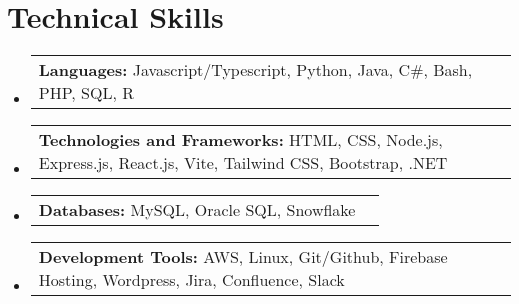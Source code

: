 \documentclass[letterpaper,11pt]{article}
\makeatletter
\newcommand{\resumeSubItem}[2]{ %
  \item
    \begin{tabular*}{\textwidth}{@{}l@{}l}
      {\small\textbf{#1}} {\small #2} \\ %
    \end{tabular*}\vspace{-6pt}
}
\newcommand{\resumeSubHeadingListStart}{\begin{itemize}[leftmargin=0.0in, label={}]}
\newcommand{\resumeSubHeadingListEnd}{\end{itemize}}
\makeatother
\begin{document}
\section{Technical Skills}
  \resumeSubHeadingListStart
    \resumeSubItem{Languages:}
      {Javascript/Typescript, Python, Java, C\#, Bash, PHP, SQL, R}
    \resumeSubItem{Technologies and Frameworks:}
      {HTML, CSS, Node.js, Express.js, React.js, Vite, Tailwind CSS, Bootstrap, .NET}
    \resumeSubItem{Databases:}
      {MySQL, Oracle SQL, Snowflake}
    \resumeSubItem{Development Tools:}
      {AWS, Linux, Git/Github, Firebase Hosting, Wordpress, Jira, Confluence, Slack}
  \resumeSubHeadingListEnd
\end{document}
